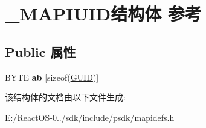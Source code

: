 \hypertarget{struct___m_a_p_i_u_i_d}{}\section{\+\_\+\+M\+A\+P\+I\+U\+I\+D结构体 参考}
\label{struct___m_a_p_i_u_i_d}
\subsection*{Public 属性}
\begin{DoxyCompactItemize}
\item 
\mbox{\label{struct___m_a_p_i_u_i_d_a96f7fda7c6ebb5c8e12aaf4f4d602995}} 
B\+Y\+TE {\bfseries ab} \mbox{[}sizeof(\hyperlink{interface_g_u_i_d}{G\+U\+ID})\mbox{]}
\end{DoxyCompactItemize}


该结构体的文档由以下文件生成\+:\begin{DoxyCompactItemize}
\item 
E\+:/\+React\+O\+S-\/0../sdk/include/psdk/mapidefs.\+h\end{DoxyCompactItemize}
